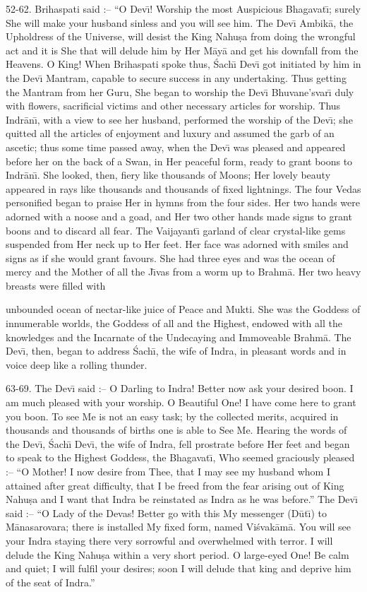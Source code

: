 52-62. Brihaspati said :-- ``O Dev\={\i}! Worship the most Auspicious Bhagavat\={\i}; surely She will make your husband sinless and you will see him. The Dev\={\i} Ambik\=a, the Upholdress of the Universe, will desist the King Nahu\d{s}a from doing the wrongful act and it is She that will delude him by Her M\=ay\=a and get his downfall from the Heavens. O King! When Brihaspati spoke thus, \'Sach\={\i} Dev\={\i} got initiated by him in the Dev\={\i} Mantram, capable to secure success in any undertaking. Thus getting the Mantram from her Guru, She began to worship the Dev\={\i} Bhuvane'svar\={\i} duly with flowers, sacrificial victims and other necessary articles for worship. Thus Indr\=an\={\i}, with a view to see her husband, performed the worship of the Dev\={\i}; she quitted all the articles of enjoyment and luxury and assumed the garb of an ascetic; thus some time passed away, when the Dev\={\i} was pleased and appeared before her on the back of a Swan, in Her peaceful form, ready to grant boons to Indr\=an\={\i}. She looked, then, fiery like thousands of Moons; Her lovely beauty appeared in rays like thousands and thousands of fixed lightnings. The four Vedas personified began to praise Her in hymns from the four sides. Her two hands were adorned with a noose and a goad, and Her two other hands made signs to grant boons and to discard all fear. The Vaijayant\={\i} garland of clear crystal-like gems suspended from Her neck up to Her feet. Her face was adorned with smiles and signs as if she would grant favours. She had three eyes and was the ocean of mercy and the Mother of all the J\={\i}vas from a worm up to Brahm\=a. Her two heavy breasts were filled with

unbounded ocean of nectar-like juice of Peace and Mukti. She was the Goddess of innumerable worlds, the Goddess of all and the Highest, endowed with all the knowledges and the Incarnate of the Undecaying and Immoveable Brahm\=a. The Dev\={\i}, then, began to address \'Sach\={\i}, the wife of Indra, in pleasant words and in voice deep like a rolling thunder.

63-69. The Dev\={\i} said :-- O Darling to Indra! Better now ask your desired boon. I am much pleased with your worship. O Beautiful One! I have come here to grant you boon. To see Me is not an easy task; by the collected merits, acquired in thousands and thousands of births one is able to See Me. Hearing the words of the Dev\={\i}, \'Sach\={\i} Dev\={\i}, the wife of Indra, fell prostrate before Her feet and began to speak to the Highest Goddess, the Bhagavat\={\i}, Who seemed graciously pleased :-- ``O Mother! I now desire from Thee, that I may see my husband whom I attained after great difficulty, that I be freed from the fear arising out of King Nahu\d{s}a and I want that Indra be reinstated as Indra as he was before.'' The Dev\={\i} said :-- ``O Lady of the Devas! Better go with this My messenger (D\=ut\={\i}) to M\=anasarovara; there is installed My fixed form, named Vi\'svak\=am\=a. You will see your Indra staying there very sorrowful and overwhelmed with terror. I will delude the King Nahu\d{s}a within a very short period. O large-eyed One! Be calm and quiet; I will fulfil your desires; soon I will delude that king and deprive him of the seat of Indra.''

